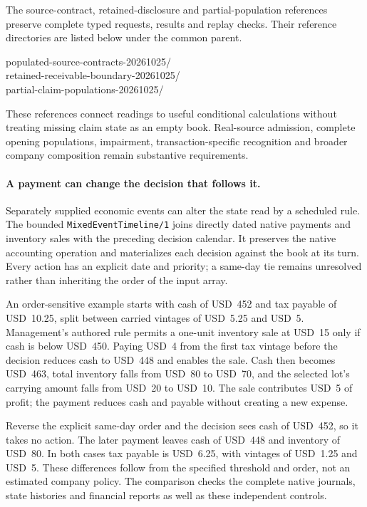 The source-contract, retained-disclosure and partial-population references
preserve complete typed requests, results and replay checks. Their reference
directories are listed below under the common
 parent.
\begin{flushleft}\small\ttfamily
populated-source-contracts-20261025/\\
retained-receivable-boundary-20261025/\\
partial-claim-populations-20261025/
\end{flushleft}
These references connect readings to useful conditional calculations without treating missing claim
state as an empty book. Real-source admission, complete opening populations,
impairment, transaction-specific recognition and broader company composition
remain substantive requirements.


\paragraph{A payment can change the decision that follows it.}
Separately supplied economic events can alter the state read by a scheduled
rule. The bounded \texttt{MixedEventTimeline/1} joins directly dated native
payments and inventory sales with the preceding decision calendar. It preserves
the native accounting operation and materializes each decision against the book
at its turn. Every action has an explicit date and priority; a same-day tie
remains unresolved rather than inheriting the order of the input array.

An order-sensitive example starts with cash of USD~452 and tax payable of
USD~10.25, split between carried vintages of USD~5.25 and USD~5. Management's
authored rule permits a one-unit inventory sale at USD~15 only if cash is below
USD~450. Paying USD~4 from the first tax vintage before the decision reduces
cash to USD~448 and enables the sale. Cash then becomes USD~463, total inventory
falls from USD~80 to USD~70, and the selected lot's carrying amount falls from
USD~20 to USD~10. The sale contributes USD~5 of profit; the payment reduces cash
and payable without creating a new expense.

Reverse the explicit same-day order and the decision sees cash of USD~452,
so it takes no action. The later payment leaves cash of USD~448 and inventory
of USD~80. In both cases tax payable is USD~6.25, with vintages of USD~1.25 and
USD~5. These differences follow from the specified threshold and order, not an
estimated company policy. The comparison checks the complete native journals,
state histories and financial reports as well as these independent controls.

